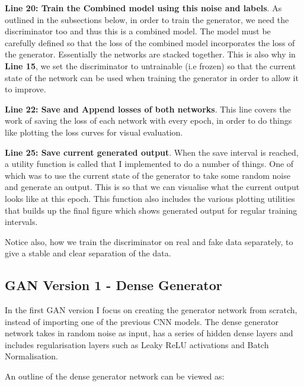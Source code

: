 \documentclass[12pt,a4paper,twoside]{report}
\begin{document}
\textbf{Line 20: Train the Combined model using this noise and labels}. As outlined in the subsections below, in order to train the generator, we need the discriminator too and thus this is a combined model. The model must be carefully defined so that the loss of the combined model incorporates the loss of the generator. Essentially the networks are stacked together. This is also why in \textbf{Line 15}, we set the discriminator to untrainable (i.e frozen) so that the current state of the network can be used when training the generator in order to allow it to improve. 

\textbf{Line 22: Save and Append losses of both networks}. This line covers the work of saving the loss of each network with every epoch, in order to do things like plotting the loss curves for visual evaluation.

\textbf{Line 25: Save current generated output}. When the save interval is reached, a utility function is called that I implemented to do a number of things. One of which was to use the current state of the generator to take some random noise and generate an output. This is so that we can visualise what the current output looks like at this epoch. This function also includes the various plotting utilities that builds up the final figure which shows generated output for regular training intervals. 

Notice also, how we train the discriminator on real and fake data separately, to give a stable and clear separation of the data.

\subsection{GAN Version 1 - Dense Generator}

In the first GAN version I focus on creating the generator network from scratch, instead of importing one of the previous CNN models. The dense generator network takes in random noise as input, has a series of hidden dense layers and includes regularisation layers such as Leaky ReLU activations and Batch Normalisation.

An outline of the dense generator network can be viewed as:

\end{document}
